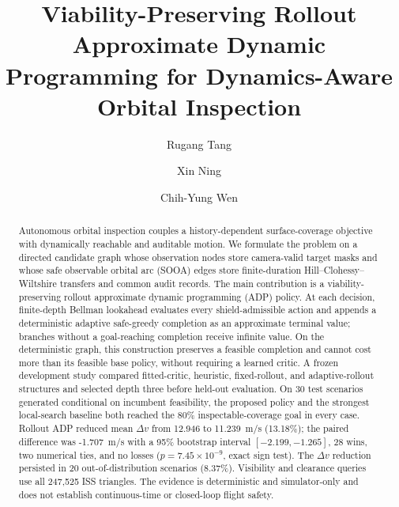 \documentclass{IEEEtaes}
\newcommand{\unit}[2]{#1~#2}
\theoremstyle{remark}
\theoremstyle{plain}
\begin{document}
\title{Viability-Preserving Rollout Approximate Dynamic Programming for Dynamics-Aware Orbital Inspection}

\author{Rugang Tang}

\author{Xin Ning}

\author{Chih-Yung Wen}


\receiveddate{}




\maketitle

\begin{abstract}
Autonomous orbital inspection couples a history-dependent surface-coverage objective with dynamically reachable and auditable motion. We formulate the problem on a directed candidate graph whose observation nodes store camera-valid target masks and whose safe observable orbital arc (SOOA) edges store finite-duration Hill--Clohessy--Wiltshire transfers and common audit records. The main contribution is a viability-preserving rollout approximate dynamic programming (ADP) policy. At each decision, finite-depth Bellman lookahead evaluates every shield-admissible action and appends a deterministic adaptive safe-greedy completion as an approximate terminal value; branches without a goal-reaching completion receive infinite value. On the deterministic graph, this construction preserves a feasible completion and cannot cost more than its feasible base policy, without requiring a learned critic. A frozen development study compared fitted-critic, heuristic, fixed-rollout, and adaptive-rollout structures and selected depth three before held-out evaluation. On 30 test scenarios generated conditional on incumbent feasibility, the proposed policy and the strongest local-search baseline both reached the 80\% inspectable-coverage goal in every case. Rollout ADP reduced mean $\Delta v$ from 12.946 to \unit{11.239}{m/s} (13.18\%); the paired difference was \unit{-1.707}{m/s} with a 95\% bootstrap interval $[-2.199,-1.265]$, 28 wins, two numerical ties, and no losses ($p=7.45\times10^{-9}$, exact sign test). The $\Delta v$ reduction persisted in 20 out-of-distribution scenarios (8.37\%). Visibility and clearance queries use all 247,525 ISS triangles. The evidence is deterministic and simulator-only and does not establish continuous-time or closed-loop flight safety.
\end{abstract}
\end{document}
